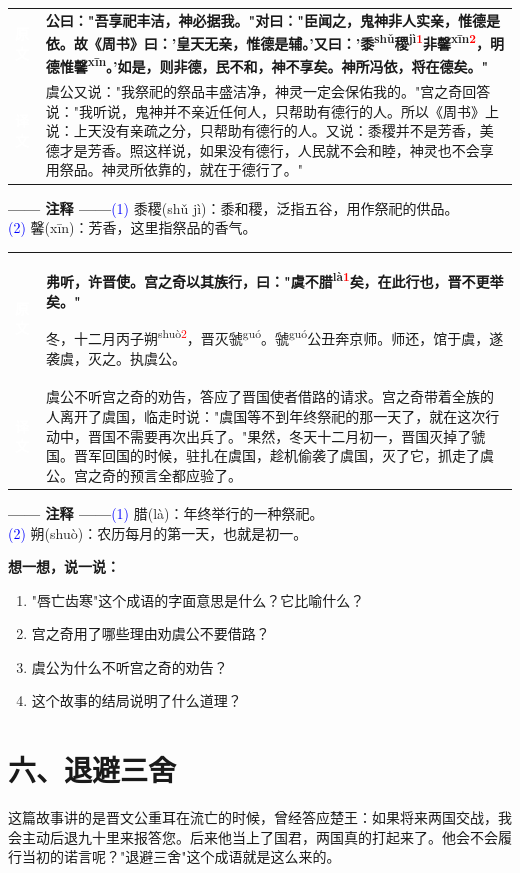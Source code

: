 \documentclass[a4paper,12pt]{ctexart}
\makeatletter
\newcommand{\ruby}[2]{#1\textsuperscript{#2}}
\newlength{\colA}\setlength{\colA}{0.06\textwidth}
\newlength{\colB}\setlength{\colB}{0.64\textwidth}
\newlength{\colC}\setlength{\colC}{0.26\textwidth}
\newcommand{\sectab}[3]{%
  \noindent
  \begin{minipage}[c]{\dimexpr\colA+\colB+2\tabcolsep\relax}
  \begin{tabular}{@{}p{\colA}p{\colB}@{}}
  \sideyuan  & {\large\bfseries #1} \\
  \sideyiwen & {\large #2} \\
  \end{tabular}
  \end{minipage}
  \hfill
  \begin{minipage}[c]{\colC}
  {\labelann\vspace{0.1cm}}#3
  \end{minipage}
  \par
}
\newcommand{\sideyuan}{\colorbox{blue!70!black}{\textcolor{white}{\normalsize\textbf{原文}}}}
\newcommand{\sideyiwen}{\colorbox{green!60!black}{\textcolor{white}{\normalsize\textbf{译文}}}}
\newcommand{\labelann}{\textcolor{orange!80!black}{\small\textbf{—— 注释 ——}}}
\newcommand{\refmark}[1]{\textsuperscript{\textcolor{red}{#1}}}
\makeatother
\begin{document}
\vspace{0.3cm}
\sectab{公曰："吾享祀丰洁，神必据我。"对曰："臣闻之，鬼神非人实亲，惟德是依。故《周书》曰：'皇天无亲，惟德是辅。'又曰：'\ruby{黍}{shǔ}\ruby{稷}{jì}\refmark{1}非\ruby{馨}{xīn}\refmark{2}，明德惟\ruby{馨}{xīn}。'如是，则非德，民不和，神不享矣。神所冯依，将在德矣。"}{虞公又说："我祭祀的祭品丰盛洁净，神灵一定会保佑我的。"宫之奇回答说："我听说，鬼神并不亲近任何人，只帮助有德行的人。所以《周书》上说：上天没有亲疏之分，只帮助有德行的人。又说：黍稷并不是芳香，美德才是芳香。照这样说，如果没有德行，人民就不会和睦，神灵也不会享用祭品。神灵所依靠的，就在于德行了。"}{{\small \textcolor{blue}{(1)} 黍稷(shǔ jì)：黍和稷，泛指五谷，用作祭祀的供品。}\\[0.1cm]{\small \textcolor{blue}{(2)} 馨(xīn)：芳香，这里指祭品的香气。}}

\sectab{弗听，许晋使。宫之奇以其族行，曰："虞不\ruby{腊}{là}\refmark{1}矣，在此行也，晋不更举矣。"\par
冬，十二月丙子\ruby{朔}{shuò}\refmark{2}，晋灭\ruby{虢}{guó}。\ruby{虢}{guó}公丑奔京师。师还，馆于虞，遂袭虞，灭之。执虞公。}{虞公不听宫之奇的劝告，答应了晋国使者借路的请求。宫之奇带着全族的人离开了虞国，临走时说："虞国等不到年终祭祀的那一天了，就在这次行动中，晋国不需要再次出兵了。"果然，冬天十二月初一，晋国灭掉了虢国。晋军回国的时候，驻扎在虞国，趁机偷袭了虞国，灭了它，抓走了虞公。宫之奇的预言全都应验了。}{{\small \textcolor{blue}{(1)} 腊(là)：年终举行的一种祭祀。}\\[0.1cm]{\small \textcolor{blue}{(2)} 朔(shuò)：农历每月的第一天，也就是初一。}}

\vspace{0.3cm}
{\large\textcolor{orange!80!black}{\textbf{想一想，说一说：}}}
\begin{enumerate}
  \item "唇亡齿寒"这个成语的字面意思是什么？它比喻什么？
  \item 宫之奇用了哪些理由劝虞公不要借路？
  \item 虞公为什么不听宫之奇的劝告？
  \item 这个故事的结局说明了什么道理？
\end{enumerate}

\newpage

\section*{\textcolor{orange!80!black}{六、退避三舍}}

这篇故事讲的是晋文公重耳在流亡的时候，曾经答应楚王：如果将来两国交战，我会主动后退九十里来报答您。后来他当上了国君，两国真的打起来了。他会不会履行当初的诺言呢？"退避三舍"这个成语就是这么来的。
\end{document}
